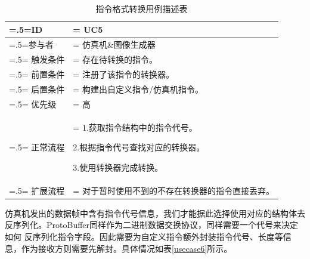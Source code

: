 \begin{table}[htbp]
    \begin{center}
        \caption{指令格式转换用例描述表}
        \label{usecase5}
        \renewcommand\arraystretch{1.5}
        \begin{tabularx}{0.8\textwidth}{ 
            | >{\centering\arraybackslash\hsize=.5\hsize\linewidth=\hsize}X 
            | >{\raggedright\arraybackslash\hsize=1.5\hsize\linewidth=\hsize}X 
            | }
            \hline
            \textbf{ID} & \textbf{UC5}\\
            \hline
            参与者 & 仿真机\&图像生成器\\
            \hline
            触发条件 & 存在待转换的指令。\\
            \hline
            前置条件 & 注册了该指令的转换器。\\
            \hline
            后置条件 & 构建出自定义指令/仿真机指令。\\
            \hline
            优先级 & 高\\
            \hline
            正常流程 &  1.获取指令结构中的指令代号。\par 2.根据指令代号查找对应的转换器。\par 3.使用转换器完成转换。\\
            \hline
            扩展流程 & 对于暂时使用不到的不存在转换器的指令直接丢弃。\\
            \hline
        \end{tabularx}
    \end{center}
\end{table}
\par
仿真机发出的数据帧中含有指令代号信息，我们才能据此选择使用对应的结构体去反序列化。ProtoBuffer同样作为二进制数据交换协议，同样需要一个代号来决定如何
反序列化指令字段。因此需要为自定义指令额外封装指令代号、长度等信息，作为接收方则需要先解封。具体情况如表\ref{usecase6}所示。
